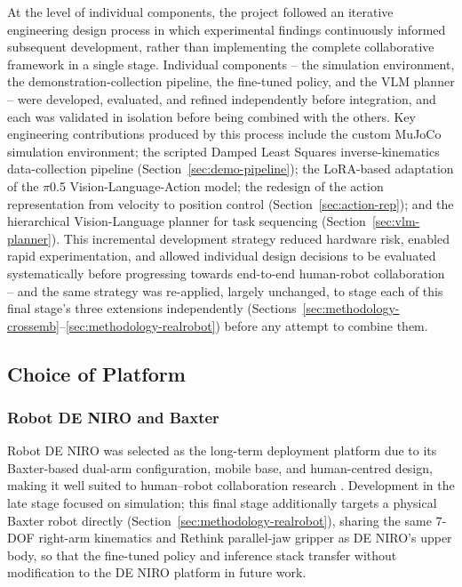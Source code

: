 \documentclass[12pt]{article}
\begin{document}
At the level of individual components, the project followed an iterative engineering design process in which experimental findings continuously informed subsequent development, rather than implementing the complete collaborative framework in a single stage. Individual components -- the simulation environment, the demonstration-collection pipeline, the fine-tuned policy, and the VLM planner -- were developed, evaluated, and refined independently before integration, and each was validated in isolation before being combined with the others. Key engineering contributions produced by this process include the custom MuJoCo simulation environment; the scripted Damped Least Squares inverse-kinematics data-collection pipeline (Section~\ref{sec:demo-pipeline}); the LoRA-based adaptation of the $\pi$0.5 Vision-Language-Action model; the redesign of the action representation from velocity to position control (Section~\ref{sec:action-rep}); and the hierarchical Vision-Language planner for task sequencing (Section~\ref{sec:vlm-planner}). This incremental development strategy reduced hardware risk, enabled rapid experimentation, and allowed individual design decisions to be evaluated systematically before progressing towards end-to-end human-robot collaboration -- and the same strategy was re-applied, largely unchanged, to stage each of this final stage's three extensions independently (Sections~\ref{sec:methodology-crossemb}--\ref{sec:methodology-realrobot}) before any attempt to combine them.

\subsection{Choice of Platform}

\subsubsection{Robot DE NIRO and Baxter}
Robot DE NIRO was selected as the long-term deployment platform due to its Baxter-based dual-arm configuration, mobile base, and human-centred design, making it well suited to human--robot collaboration research \cite{falck2020robot}. Development in the late stage focused on simulation; this final stage additionally targets a physical Baxter robot directly (Section~\ref{sec:methodology-realrobot}), sharing the same 7-DOF right-arm kinematics and Rethink parallel-jaw gripper as DE NIRO's upper body, so that the fine-tuned policy and inference stack transfer without modification to the DE NIRO platform in future work.
\end{document}
